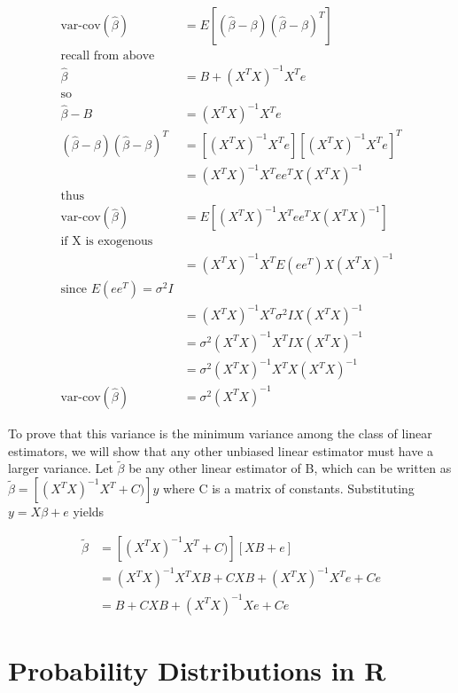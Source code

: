 \documentclass[]{book}
\begin{document}
\[\begin{aligned}
\text{var-cov}(\hat{\beta}) &= E\left[(\hat{\beta}-\beta)(\hat{\beta}-\beta)^T\right]\\
\text{recall from above}\\
\hat{\beta} &= B + (X^TX)^{-1}X^Te\\
\text{so} \\
\hat{\beta} - B &= (X^TX)^{-1}X^Te\\
(\hat{\beta}-\beta)(\hat{\beta}-\beta)^T &= \left[(X^TX)^{-1}X^Te\right]\left[(X^TX)^{-1}X^Te\right]^T\\
&= (X^TX)^{-1}X^Tee^TX(X^TX)^{-1}\\
\text{thus} \\
\text{var-cov}(\hat{\beta}) &= E\left[ (X^TX)^{-1}X^Tee^TX(X^TX)^{-1}\right]\\
\text{if X is exogenous}\\
&= (X^TX)^{-1}X^TE(ee^T)X(X^TX)^{-1}\\
\text{since  } E(ee^T) = \sigma^2I\\
&= (X^TX)^{-1}X^T \sigma^2 I X(X^TX)^{-1}\\
&= \sigma^2(X^TX)^{-1}X^T  I X(X^TX)^{-1}\\
&= \sigma^2(X^TX)^{-1}X^T  X(X^TX)^{-1}\\
\text{var-cov}(\hat{\beta})&=\sigma^2(X^TX)^{-1}
\end{aligned}\]

To prove that this variance is the minimum variance among the class of linear estimators, we will show that any other unbiased linear estimator must have a larger variance. Let \(\tilde{\beta}\) be any other linear estimator of B, which can be written as\(\tilde{\beta} = \left[ (X^TX)^{-1}X^T+C) \right]y\) where C is a matrix of constants. Substituting \(y = X\beta+e\) yields

\[
\begin{aligned}
\tilde{\beta} &=  \left[ (X^TX)^{-1}X^T+C) \right]\left[ XB+e \right]\\
&= (X^TX)^{-1}X^TXB + CXB + (X^TX)^{-1}X^Te + Ce\\
&= B + CXB + (X^TX)^{-1}Xe + Ce
\end{aligned}
\]

\hypertarget{probability-distributions-in-r-1}{%
\section{Probability Distributions in R}\label{probability-distributions-in-r-1}}
\end{document}
